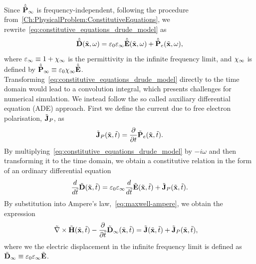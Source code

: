 Since $\hat{\tilde{\mathbf{P}}}_{\infty}$ is frequency-independent, following the procedure
from~\autoref{Ch:PhysicalProblem:ConstitutiveEquations}, we
rewrite~\eqref{eq:constitutive_equations_drude_model} as
\begin{equation}
  \hat{\tilde{\mathbf{D}}}(\tilde{\mathbf{x}},\omega) = \varepsilon_0 \varepsilon_{\infty} \hat{\tilde{\mathbf{E}}}(\tilde{\mathbf{x}}, \omega) + \hat{\tilde{\mathbf{P}}}_e(\tilde{\mathbf{x}},\omega) ,
\end{equation}
where $\varepsilon_{\infty} \equiv 1 + \chi_{\infty} $ is the permittivity in the
infinite frequency limit, and $\chi_{\infty}$ is defined by $\hat{\tilde{\mathbf{P}}}_{\infty}
\equiv \varepsilon_0 \chi_{\infty} \hat{\tilde{\mathbf{E}}} $.
Transforming~\eqref{eq:constitutive_equations_drude_model} directly to the time
domain would lead to a convolution integral, which presents challenges for
numerical simulation\cite{kelley1996piecewise}. We instead follow the so called
auxiliary differential equation (ADE)
approach\cite{Taflove:1989ds,Stannigel:09, Ji:2007dl,okoniewski1997simple,kashiwa1990treatment}. First we define the current due to free electron polarisation, $\tilde{\mathbf{J}}_P$, as
\begin{align}
  \tilde{\mathbf{J}}_P(\tilde{\mathbf{x}},\tilde{t}) =  \frac{\partial}{\partial t} \tilde{\mathbf{P}}_e(\tilde{\mathbf{x}},\tilde{t}). \label{eq:polarisation-current-definition}
\end{align}
By multiplying~\eqref{eq:constitutive_equations_drude_model} by $ -i \omega$ and
then transforming it to the time domain, we obtain a constitutive relation in
the form of an ordinary differential equation
\begin{equation}
  \label{eq:constitutive_equations_drude_model_derivative_TD}
  \frac{d}{d \tilde{t}}  \tilde{\mathbf{D}} (\tilde{\mathbf{x}},\tilde{t})= \varepsilon_0 \varepsilon_{\infty} \frac{d}{d \tilde{t}}  \tilde{\mathbf{E}} (\tilde{\mathbf{x}}, \tilde{t}) + \tilde{\mathbf{J}}_P(\tilde{\mathbf{x}},\tilde{t}) .
\end{equation}
By substitution into Ampere's law,~\eqref{eq:maxwell-ampere}, we obtain the
expression
\begin{align}
  \tilde{\nabla} \times \tilde{\mathbf{H}}(\tilde{\mathbf{x}},\tilde{t}) - \frac{\partial}{\partial \tilde{t} } \tilde{\mathbf{D}}_{\infty}(\tilde{\mathbf{x}}, \tilde{t}) &= \tilde{\mathbf{J}}(\tilde{\mathbf{x}},\tilde{t}) + \tilde{\mathbf{J}}_P(\tilde{\mathbf{x}},\tilde{t}) , \label{eq:drude-ampere}
\end{align}
where we the electric displacement in the
infinite frequency limit is defined as $\tilde{\mathbf{D}}_{\infty} \equiv \varepsilon_0 \varepsilon_{\infty} \tilde{\mathbf{E}}$.

